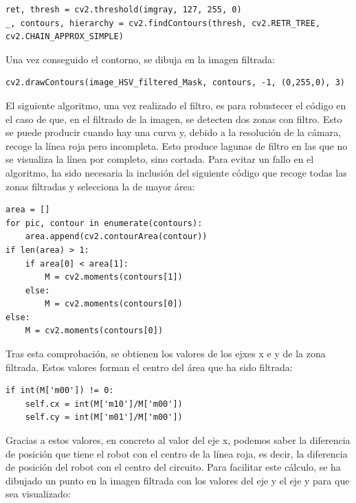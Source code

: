 \lstset{language=Python, breaklines=true, basicstyle=\footnotesize}
\begin{lstlisting}[frame=single]
ret, thresh = cv2.threshold(imgray, 127, 255, 0)
_, contours, hierarchy = cv2.findContours(thresh, cv2.RETR_TREE, cv2.CHAIN_APPROX_SIMPLE)
\end{lstlisting}

Una vez conseguido el contorno, se dibuja en la imagen filtrada:

\lstset{language=Python, breaklines=true, basicstyle=\footnotesize}
\begin{lstlisting}[frame=single]
cv2.drawContours(image_HSV_filtered_Mask, contours, -1, (0,255,0), 3)
\end{lstlisting}

El siguiente algoritmo, una vez realizado el filtro, es para robustecer el código en el caso de que, en el filtrado de la imagen, se detecten dos zonas con filtro. Esto se puede producir cuando hay una curva y, debido a la resolución de la cámara, recoge la línea roja pero incompleta. Esto produce lagunas de filtro en las que no se visualiza la línea por completo, sino cortada. Para evitar un fallo en el algoritmo, ha sido necesaria la inclusión del siguiente código que recoge todas las zonas filtradas y selecciona la de mayor área:

\lstset{language=Python, breaklines=true, basicstyle=\footnotesize}
\begin{lstlisting}[frame=single]
area = []
for pic, contour in enumerate(contours):
    area.append(cv2.contourArea(contour))
if len(area) > 1:
    if area[0] < area[1]:
        M = cv2.moments(contours[1])
    else:
        M = cv2.moments(contours[0])
else:
    M = cv2.moments(contours[0])
\end{lstlisting}

Tras esta comprobación, se obtienen los valores de los ejxes x e y de la zona filtrada. Estos valores forman el centro del área que ha sido filtrada:

\lstset{language=Python, breaklines=true, basicstyle=\footnotesize}
\begin{lstlisting}[frame=single]
if int(M['m00']) != 0:
    self.cx = int(M['m10']/M['m00'])
    self.cy = int(M['m01']/M['m00'])
\end{lstlisting}

Gracias a estos valores, en concreto al valor del eje x, podemos saber la diferencia de posición que tiene el robot con el centro de la línea roja, es decir, la diferencia de posición del robot con el centro del circuito. Para facilitar este cálculo, se ha dibujado un punto en la imagen filtrada con los valores del eje y el eje y para que sea visualizado:

